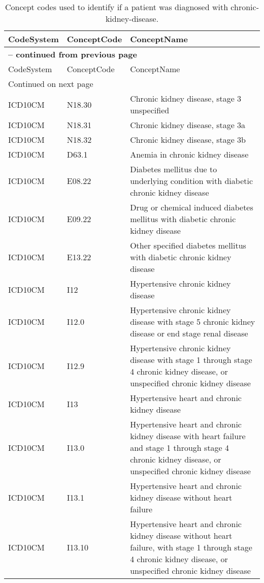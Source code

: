 \begin{longtable}{p{}p{}p{}}
\caption{Concept codes used to identify if a patient was diagnosed with chronic-kidney-disease.} \\ 
 CodeSystem & ConceptCode & ConceptName \\ 
  \hline 
\endfirsthead 
\multicolumn{3}{p{\textwidth}}{{ \bfseries \tablename \thetable{} -- continued from previous page}} \\ 
\hline CodeSystem & ConceptCode & ConceptName \\ \hline 
\endhead 
\hline \multicolumn{3}{p{\textwidth}}{{Continued on next page}} \\ \hline 
\endfoot 
\hline 
\endlastfoot 
 \hline
ICD10CM & N18.30 & Chronic kidney disease, stage 3 unspecified \\ 
  ICD10CM & N18.31 & Chronic kidney disease, stage 3a \\ 
  ICD10CM & N18.32 & Chronic kidney disease, stage 3b \\ 
  ICD10CM & D63.1 & Anemia in chronic kidney disease \\ 
  ICD10CM & E08.22 & Diabetes mellitus due to underlying condition with diabetic chronic kidney disease \\ 
  ICD10CM & E09.22 & Drug or chemical induced diabetes mellitus with diabetic chronic kidney disease \\ 
  ICD10CM & E13.22 & Other specified diabetes mellitus with diabetic chronic kidney disease \\ 
  ICD10CM & I12 & Hypertensive chronic kidney disease \\ 
  ICD10CM & I12.0 & Hypertensive chronic kidney disease with stage 5 chronic kidney disease or end stage renal disease \\ 
  ICD10CM & I12.9 & Hypertensive chronic kidney disease with stage 1 through stage 4 chronic kidney disease, or unspecified chronic kidney disease \\ 
  ICD10CM & I13 & Hypertensive heart and chronic kidney disease \\ 
  ICD10CM & I13.0 & Hypertensive heart and chronic kidney disease with heart failure and stage 1 through stage 4 chronic kidney disease, or unspecified chronic kidney disease \\ 
  ICD10CM & I13.1 & Hypertensive heart and chronic kidney disease without heart failure \\ 
  ICD10CM & I13.10 & Hypertensive heart and chronic kidney disease without heart failure, with stage 1 through stage 4 chronic kidney disease, or unspecified chronic kidney disease \\ 

\end{longtable}
